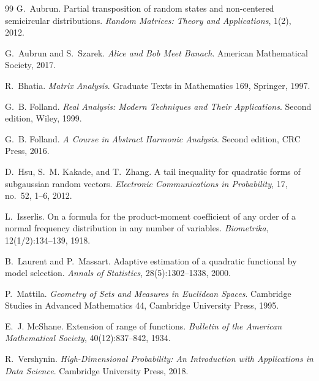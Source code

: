\documentclass[11pt,oneside]{book}
\newcommand{\1}{\mathbf 1}
\begin{document}
\begin{thebibliography}{99}
G.~Aubrun.
\newblock Partial transposition of random states and non-centered semicircular
distributions.
\newblock \emph{Random Matrices: Theory and Applications}, 1(2), 2012.

G.~Aubrun and S.~Szarek.
\newblock \emph{Alice and Bob Meet Banach}.
\newblock American Mathematical Society, 2017.

R.~Bhatia.
\newblock \emph{Matrix Analysis}.
\newblock Graduate Texts in Mathematics 169, Springer, 1997.

G.~B. Folland.
\newblock \emph{Real Analysis: Modern Techniques and Their Applications}.
\newblock Second edition, Wiley, 1999.

G.~B. Folland.
\newblock \emph{A Course in Abstract Harmonic Analysis}.
\newblock Second edition, CRC Press, 2016.

D.~Hsu, S.~M. Kakade, and T.~Zhang.
\newblock A tail inequality for quadratic forms of subgaussian random vectors.
\newblock \emph{Electronic Communications in Probability}, 17, no.~52,
1--6, 2012.

L.~Isserlis.
\newblock On a formula for the product-moment coefficient of any order of a
normal frequency distribution in any number of variables.
\newblock \emph{Biometrika}, 12(1/2):134--139, 1918.

B.~Laurent and P.~Massart.
\newblock Adaptive estimation of a quadratic functional by model selection.
\newblock \emph{Annals of Statistics}, 28(5):1302--1338, 2000.

P.~Mattila.
\newblock \emph{Geometry of Sets and Measures in Euclidean Spaces}.
\newblock Cambridge Studies in Advanced Mathematics 44, Cambridge University
Press, 1995.

E.~J. McShane.
\newblock Extension of range of functions.
\newblock \emph{Bulletin of the American Mathematical Society},
40(12):837--842, 1934.

R.~Vershynin.
\newblock \emph{High-Dimensional Probability: An Introduction with
Applications in Data Science}.
\newblock Cambridge University Press, 2018.
\end{thebibliography}
\end{document}
